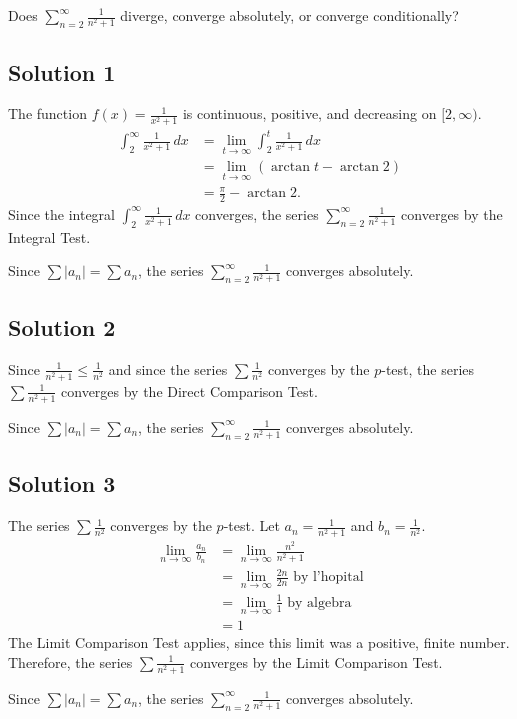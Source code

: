 \documentclass{article}
\begin{document}
\noindent
Does $\displaystyle \sum_{n=2}^\infty \frac{1}{n^2+1}$
diverge, converge absolutely, or converge conditionally?

\subsection*{Solution 1}

The function $f(x)=\frac{1}{x^2+1}$ is continuous, positive, and decreasing on $[2,\infty)$.
\begin{align*}
\int_2^\infty \frac{1}{x^2+1}\,dx
&= \lim_{t \to \infty} \int_2^t \frac{1}{x^2+1}\,dx\\
&= \lim_{t \to \infty} (\arctan t-\arctan2)\\
&= \frac\pi2-\arctan2.
\end{align*}
Since the integral $\displaystyle \int_2^\infty \frac{1}{x^2+1}\,dx$ converges, the series $\displaystyle \sum_{n=2}^\infty \frac{1}{n^2+1}$ converges by the Integral Test.

Since $\sum |a_n| = \sum a_n$, the series $\displaystyle \sum_{n=2}^\infty \frac1{n^2+1}$ converges absolutely.

\subsection*{Solution 2}

Since $\frac{1}{n^2+1} \leq \frac{1}{n^2}$ and since the series $\sum \frac1{n^2}$ converges by the $p$-test, the series $\sum \frac1{n^2+1}$ converges by the Direct Comparison Test.

Since $\sum |a_n| = \sum a_n$, the series $\displaystyle \sum_{n=2}^\infty \frac1{n^2+1}$ converges absolutely.

\subsection*{Solution 3}

The series $\sum \frac1{n^2}$ converges by the $p$-test. Let $a_n = \frac{1}{n^2+1}$ and $b_n = \frac1{n^2}$.
\begin{align*}
\lim_{n \to \infty} \frac{a_n}{b_n}
&= \lim_{n \to \infty} \frac{n^2}{n^2+1}\\
&= \lim_{n \to \infty} \frac{2n}{2n} \text{ by l'hopital}\\
&= \lim_{n \to \infty} \frac11 \text{ by algebra}\\
&= 1
\end{align*}
The Limit Comparison Test applies, since this limit was a positive, finite number. Therefore, the series $\sum \frac1{n^2+1}$ converges by the Limit Comparison Test.

Since $\sum |a_n| = \sum a_n$, the series $\displaystyle \sum_{n=2}^\infty \frac1{n^2+1}$ converges absolutely.
\end{document}
